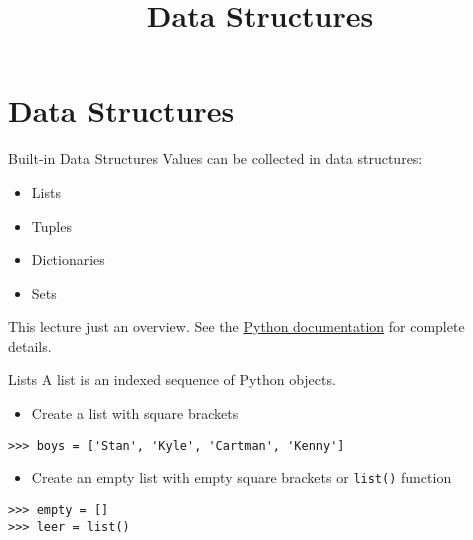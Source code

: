 \documentclass[smaller]{beamer}
\date{}
\title{Data Structures}
\begin{document}
\maketitle

\section{Data Structures}
\label{sec:org1de8709}

\begin{frame}[label={sec:org47861a6}]{Built-in Data Structures}
Values can be collected in data structures:

\begin{itemize}
\item Lists
\item Tuples
\item Dictionaries
\item Sets
\end{itemize}

This lecture just an overview. See the \href{https://docs.python.org/3.6/library/stdtypes.html}{Python documentation} for
complete details.
\end{frame}

\begin{frame}[label={sec:orge73f1bb},fragile]{Lists}
 A list is an indexed sequence of Python objects.

\begin{itemize}
\item Create a list with square brackets
\end{itemize}

\lstset{language=Python,label= ,caption= ,captionpos=b,numbers=none}
\begin{lstlisting}
>>> boys = ['Stan', 'Kyle', 'Cartman', 'Kenny']
\end{lstlisting}

\begin{itemize}
\item Create an empty list with empty square brackets or \texttt{list()} function
\end{itemize}

\lstset{language=Python,label= ,caption= ,captionpos=b,numbers=none}
\begin{lstlisting}
>>> empty = []
>>> leer = list()
\end{lstlisting}
\end{frame}
\end{document}
